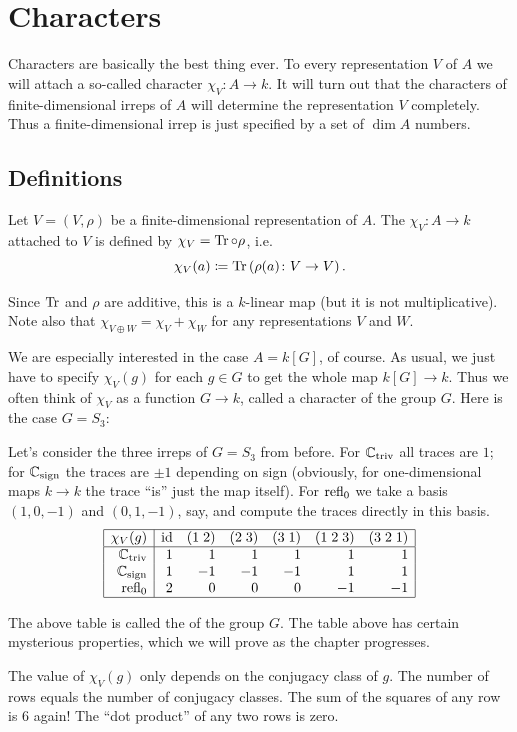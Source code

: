 \chapter{Characters}
\label{ch:characters}
Characters are basically the best thing ever.
To every representation $V$ of $A$ we will attach a
so-called character $\chi_V \colon A \to k$.
It will turn out that the characters of finite-dimensional irreps of $A$
will determine the representation $V$ completely.
Thus a finite-dimensional irrep is just specified by a set of $\dim A$ numbers.

\section{Definitions}
\begin{definition}
	Let $V = (V, \rho)$ be a finite-dimensional representation of $A$.
	The  $\chi_V \colon A \to k$ attached to
	$V$ is defined by $\chi_V = \operatorname{Tr} \circ \rho$, i.e.\
	\[ \chi_V(a) \coloneqq \operatorname{Tr}\left( \rho(a) \colon V \to V \right). \]
\end{definition}
Since $\operatorname{Tr}$ and $\rho$ are additive, this is a $k$-linear map
(but it is not multiplicative).
Note also that $\chi_{V \oplus W} = \chi_V + \chi_W$
for any representations $V$ and $W$.

We are especially interested in the case $A = k[G]$, of course.
As usual, we just have to specify $\chi_V(g)$ for each
$g \in G$ to get the whole map $k[G] \to k$.
Thus we often think of $\chi_V$ as a function $G \to k$,
called a character of the group $G$.
Here is the case $G = S_3$:
\begin{example}
	Let's consider the three irreps of $G = S_3$ from before.
	For $\mathbb C_{\text{triv}}$ all traces are $1$;
	for $\mathbb C_{\text{sign}}$ the traces are $\pm 1$ depending on sign
	(obviously, for one-dimensional maps $k \to k$ the trace ``is''
	just the map itself).
	For $\operatorname{refl}_0$ we take a basis $(1,0,-1)$ and $(0,1,-1)$, say,
	and compute the traces directly in this basis.
	\[
		\begin{array}{|r|rrrrrr|}
			\hline
			\chi_V(g) & \mathrm{id} & (1\;2) & (2\;3) & (3\;1)
				& (1\;2\;3) & (3\;2\;1)  \\ \hline
			\mathbb C_{\mathrm{triv}} & 1 & 1 & 1 & 1 & 1 & 1 \\
			\mathbb C_{\mathrm{sign}} & 1 & -1 & -1 & -1 & 1 & 1 \\
			\operatorname{refl}_0 & 2 & 0 & 0 & 0 & -1 & -1 \\ \hline
		\end{array}
	\]
\end{example}
The above table is called the  of the group $G$.
The table above has certain mysterious properties,
which we will prove as the chapter progresses.
\begin{enumerate}[(I)]
	\ii The value of $\chi_V(g)$ only depends on the conjugacy class of $g$.
	\ii The number of rows equals the number of conjugacy classes.
	\ii The sum of the squares of any row is $6$ again!
	\ii The ``dot product'' of any two rows is zero.
\end{enumerate}

